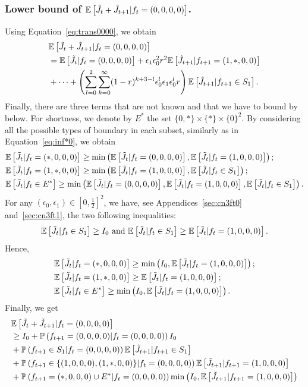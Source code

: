 \documentclass[11pt]{article}
\theoremstyle{plain}
\theoremstyle{definition}
\theoremstyle{remark}
\newcommand{\prob}[1]{\mathbb{P}\left( #1 \right)}
\newcommand{\esp}[1]{\mathbb{E}\left[ #1 \right]}
\begin{document}
\subsubsection{Lower bound of $\esp{\Tilde{J}_t + \Tilde{J}_{t+1} | f_t = (0,0,0,0)}$.}
Using Equation~\eqref{eq:trans0000}, we obtain
\begin{align*}
& \esp{\Tilde{J}_{t} + \Tilde{J}_{t+1} |f_t=(0,0,0,0)}\\
&= \esp{\Tilde{J}_{t}|f_t=(0,0,0,0)} + \epsilon_1 \epsilon_0^2 r^2 \esp{\Tilde{J}_{t+1}|f_{t+1}=(1,*,0,0)}\\
&+ \dots + \left(\sum_{l=0}^2 \sum_{k=0}^\infty  (1-r)^{k+3-l} \epsilon_0^{l} \epsilon_1 \epsilon_0^{l} r \right) \esp{\Tilde{J}_{t+1} | f_{t+1} \in S_1}. 
\end{align*}
Finally, there are three terms that are not known and that we have to bound by below. For shortness, we denote by $E^*$ the set $\{0,*\}\times\{*\}\times\{0\}^2$. By considering all the possible types of boundary in each subset, similarly as in Equation~\eqref{eq:inf*0}, we obtain
\begin{align*}
&\esp{\Tilde{J_t}|f_t=(*,0,0,0)}\geq \min \left( \esp{\Tilde{J_t}|f_t=(0,0,0,0)} ,\esp{\Tilde{J_t}|f_t=(1,0,0,0)}\right);\\
&\esp{\Tilde{J_t}|f_t=(1,*,0,0)}\geq \min \left( \esp{\Tilde{J_t}|f_t=(1,0,0,0)},\esp{\Tilde{J_t}|f_t\in S_1} \right);\\
&\esp{\Tilde{J_t}|f_t\in E^*}\geq \min \left( \esp{\Tilde{J_t}|f_t=(0,0,0,0)},\esp{\Tilde{J_t}|f_t=(1,0,0,0)},\esp{\Tilde{J_t}|f_t\in S_1} \right).
\end{align*}
For any $(\epsilon_0,\epsilon_1)\in[0,\frac{1}{2}]^2$, we have, see Appendices~\ref{sec:cn3ft0} and~\ref{sec:cn3ft1}, the two following inequalities:
\begin{displaymath}
    \esp{\Tilde{J_t}|f_t\in S_1} \geq I_0 \text{ and } \esp{\Tilde{J_t}|f_t\in S_1} \geq \esp{\Tilde{J_t}|f_t=(1,0,0,0)}.
\end{displaymath}
Hence,
\begin{align*}
    &\esp{\Tilde{J_t}|f_t=(*,0,0,0)}\geq\min \left( I_0 ,\esp{\Tilde{J_t}|f_t=(1,0,0,0)}\right);\\
    &\esp{\Tilde{J_t}|f_t= (1,*,0,0)} \geq \esp{\Tilde{J_t}|f_t=(1,0,0,0)};\\
    &\esp{\Tilde{J_t}|f_t\in E^*}\geq \min \left( I_0,\esp{\Tilde{J_t}|f_t=(1,0,0,0)}\right).
\end{align*}
Finally, we get
\begin{align}
& \esp{\Tilde{J}_{t}+\Tilde{J}_{t+1} | f_t=(0,0,0,0)}\nonumber \\
& \geq I_0 \nonumber + \prob{f_{t+1}=(0,0,0,0) |f_t=(0,0,0,0)} I_0 \nonumber \\
& + \prob{f_{t+1} \in S_1 | f_t = (0,0,0,0)} \esp{\Tilde{J}_{t+1}| f_{t+1} \in S_1} \nonumber \\
& + \prob{f_{t+1} \in \{(1,0,0,0),(1,*,0,0)\} |f_t=(0,0,0,0)} \esp{\Tilde{J}_{t+1}|f_{t+1}=(1,0,0,0)} \nonumber\\
& + \prob{f_{t+1}=(*,0,0,0) \cup E^* |f_t=(0,0,0,0)} \min \left( I_0, \esp{\Tilde{J}_{t+1}|f_{t+1}=(1,0,0,0)} \right) \label{eq:lb0000}
\end{align}
\end{document}
